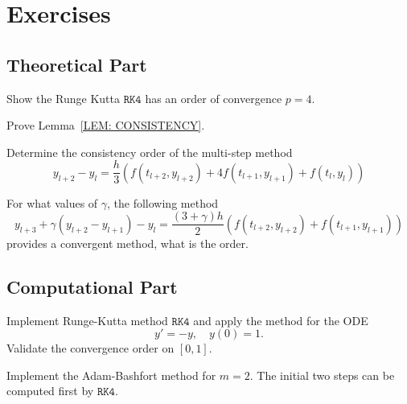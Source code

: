 \section{Exercises}
\subsection{Theoretical Part}
\begin{problem}
    Show the Runge Kutta $\texttt{RK4}$ has an order of convergence $p=4$.
\end{problem}
\begin{problem}
    Prove Lemma~\ref{LEM: CONSISTENCY}.
\end{problem}
\begin{problem}
    Determine the consistency order of the multi-step method 
    \begin{equation}
        y_{l+2} - y_{l} = \frac{h}{3} \left( f(t_{l+2}, y_{l+2}) + 4 f(t_{l+1}, y_{l+1}) + f(t_l, y_l) \right)
    \end{equation}
\end{problem}
\begin{problem}
    For what values of $\gamma$, the following method
    \begin{equation}
        y_{l+3} + \gamma(y_{l+2} - y_{l+1}) - y_{l} = \frac{(3 + \gamma) h}{2} \left( f(t_{l+2}, y_{l+2}) + f(t_{l+1}, y_{l+1}) \right)
    \end{equation} 
    provides a convergent method, what is the order.
\end{problem}
\subsection{Computational Part}
\begin{problem}
    Implement Runge-Kutta method $\texttt{RK4}$ and apply the method for the ODE 
    \begin{equation}
        y' = - y,\quad y(0) = 1.
    \end{equation}
    Validate the convergence order on $[0, 1]$.
\end{problem}
\begin{problem}
    Implement the Adam-Bashfort method for $m=2$. The initial two steps can be computed first by $\texttt{RK4}$.
\end{problem}

